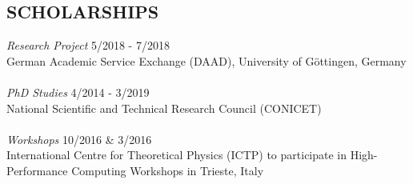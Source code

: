 \documentclass[margin]{res}
\begin{document}
\begin{resume}

\section{SCHOLARSHIPS}  {\sl Research Project} \hfill  5/2018 - 7/2018 \\
	German Academic Service Exchange
	(DAAD), University of G\"ottingen, Germany \\ \\ 
	{\sl PhD Studies} \hfill  4/2014 - 3/2019 \\
	National Scientific and Technical Research Council (CONICET) \\ \\
	{\sl Workshops} \hfill { 10/2016 \& 3/2016} \\
	International Centre for Theoretical Physics (ICTP) 
	to participate in High-Performance Computing Workshops in Trieste, Italy



\end{resume}
\end{document}
